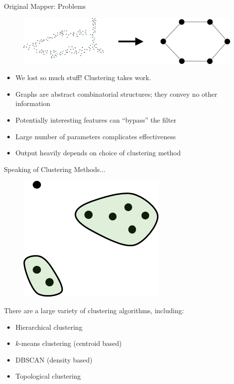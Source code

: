 \documentclass{beamer}
\begin{document}
\begin{frame}{Original Mapper: Problems}
  \begin{figure}
    \includegraphics[width=1\textwidth]{datatograph.png}
  \end{figure}
  \begin{itemize}
    \item We lost so much stuff! Clustering takes work.
    \item Graphs are abstract combinatorial structures; they convey no other information
    \item Potentially interesting features can ``bypass'' the filter
    \item Large number of parameters complicates effectiveness
    \item Output heavily depends on choice of clustering method
  \end{itemize}
\end{frame}

\begin{frame}{Speaking of Clustering Methods...}
  \begin{figure}
    \begin{center}
      \includegraphics[width=.5\textwidth]{threeclusters.png}
    \end{center}
  \end{figure}
  There are a large variety of clustering algorithms, including:
  \begin{itemize}
      \item Hierarchical clustering
      \item $k$-means clustering (centroid based)
      \item DBSCAN (density based)
      \item Topological clustering
  \end{itemize}
\end{frame}
\end{document}
